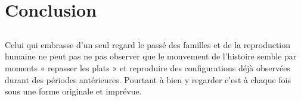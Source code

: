 
\part*{Conclusion}

\chapter[Conclusion]{}


 Celui qui embrasse d'un seul regard le passé des familles et de la reproduction humaine ne peut pas ne pas observer que le mouvement de l'histoire semble par moments « repasser les plats » et reproduire des configurations déjà observées durant des périodes antérieures. Pourtant à bien y regarder c'est à chaque fois sous une forme originale et imprévue.  
 

